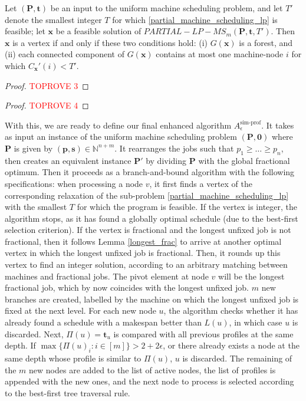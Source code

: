 \documentclass[a4paper,UKenglish,cleveref, autoref, thm-restate, pdfa]{lipics-v2021}
\theoremstyle{plain}
\begin{document}
\begin{lmm}\label{vertex_char}
    Let $(\bm{P}, \bm{t})$ be an input to the uniform machine scheduling problem, and let $T'$ denote the smallest integer $T$ for which \eqref{partial_machine_scheduling_lp} is feasible; let $\bm{x}$ be a feasible solution of $PARTIAL-LP-MS_m (\bm{P}, \bm{t}, T')$. Then $\bm{x}$ is a vertex if and only if these two conditions hold: (i) $G(\bm{x})$ is a forest, and (ii) each connected component of $G(\bm{x})$ contains at most one machine-node $i$ for which $C_{\bm{x}}'(i)<T'$.
\end{lmm}

\begin{proof}\textcolor{red}{TOPROVE 3}\end{proof}














\begin{proof}\textcolor{red}{TOPROVE 4}\end{proof}

With this, we are ready to define our final enhanced algorithm $A^{\text{sim-prof}}_{\epsilon}$. It takes as input an instance of the uniform machine scheduling problem $(\bm{P}, \bm{0})$ where $\bm{P}$ is given by $(\bm{p}, \bm{s}) \in \mathbb{N}^{n+m}$. It rearranges the jobs such that $p_1 \ge \ldots \ge p_n$, then creates an equivalent instance $\bm{P}'$ by dividing $\bm{P}$ with the global fractional optimum. Then it proceeds as a branch-and-bound algorithm with the following specifications: when processing a node $v$, it first finds a vertex of the corresponding relaxation of the sub-problem \eqref{partial_machine_scheduling_lp} with the smallest $T$ for which the program is feasible. If the vertex is  integer, the algorithm stops, as it has found a globally optimal schedule (due to the best-first selection criterion). If the vertex is fractional and the longest unfixed job is not fractional, then it follows Lemma \ref{longest_frac} to arrive at another optimal vertex in which the longest unfixed job is fractional. Then, it rounds up this vertex to find an integer solution, according to an arbitrary matching between machines and fractional jobs. The pivot element at node $v$ will be the longest fractional job, which by now coincides with the longest unfixed job. $m$ new branches are created, labelled by the machine on which the longest unfixed job is fixed at the next level. For each new node $u$, the algorithm checks whether it has already found a schedule with a makespan better than $L(u)$, in which case $u$ is discarded. Next, $\Pi(u) = \bm{t}_u$ is compared with all previous profiles at the same depth. If $\max\{\Pi(u)_i: i \in [m]\} > 2+2\epsilon$, or there already exists a node at the same depth whose profile is similar to $\Pi(u)$, $u$ is discarded. The remaining of the $m$ new nodes are added to the list of active nodes, the list of profiles is appended with the new ones, and the next node to process is selected according to the best-first tree traversal rule.
\end{document}
